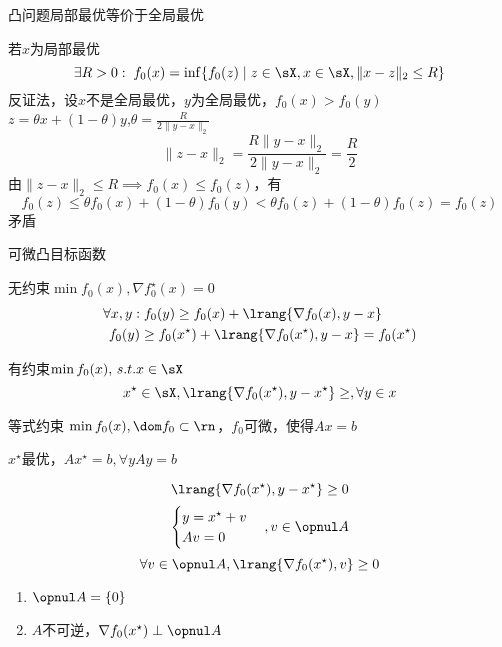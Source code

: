 \begin{theorem}
凸问题局部最优等价于全局最优
\end{theorem}
\begin{analysis}
若$x$为局部最优
\[\exists R>0:\;f_0(x)=\inf\{f_0(z)\mid z\in\sX,x\in\sX,\|x-z\|_2\leq R\}\]
反证法，设$x$不是全局最优，$y$为全局最优，$f_0(x)>f_0(y)$\\
$z=\theta x+(1-\theta)y$,$\theta=\frac{R}{2\|y-x\|_2}$
\[\|z-x\|_2=\frac{R\|y-x\|_2}{2\|y-x\|_2}=\frac{R}{2}\]
由$\|z-x\|_2\leq R\implies f_0(x)\leq f_0(z)$，有
\[f_0(z)\leq\theta f_0(x)+(1-\theta)f_0(y)<\theta f_0(z)+(1-\theta)f_0(z)=f_0(z)\]
矛盾
\end{analysis}

可微凸目标函数

无约束$\min f_0(x),\nabla f_0^\star(x)=0$
\[\begin{aligned}
\forall x,y:&\;f_0(y)\geq f_0(x)+\lrang{\nabla f_0(x),y-x}\\
f_0(y)&\geq f_0(x^\star)+\lrang{\nabla f_0(x^\star),y-x}=f_0(x^\star)
\end{aligned}\]

有约束$\min f_0(x),\,s.t. x\in\sX$
\[x^\star\in\sX,\lrang{\nabla f_0(x^\star),y-x^\star}\geq,\forall y\in x\]

\begin{example}
等式约束 $\min f_0(x),\dom f_0\subset\rn$，$f_0$可微，使得$Ax=b$
\end{example}
\begin{analysis}
$x^\star$最优，$Ax^\star=b,\forall y Ay=b$

\[\lrang{\nabla f_0(x^\star),y-x^\star}\geq 0\]
\[\begin{cases} y=x^\star+v\\Av=0\end{cases},v\in\opnul A\]
\[\forall v\in\opnul A,\lrang{\nabla f_0(x^\star),v}\geq 0\]
\begin{enumerate}
	\item $\opnul A=\{0\}$
	\item $A$不可逆，$\nabla f_0(x^\star)\perp\opnul A$
\end{enumerate}
\end{analysis}

